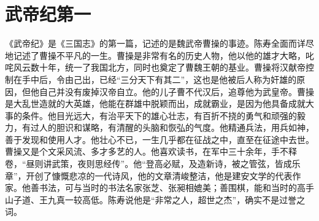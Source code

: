 \documentclass[12pt,UTF8]{ctexbook}
\begin{document}
\chapter{武帝纪第一}

《武帝纪》是《三国志》的第一篇，记述的是魏武帝曹操的事迹。陈寿全面而详尽地记述了曹操不平凡的一生。曹操是非常有名的历史人物，他以他的雄才大略，叱咤风云数十年，统一了我国北方，同时也奠定了曹魏王朝的基业。曹操将汉献帝控制在手中后，令由己出，已经“三分天下有其二”，这也是他被后人称为奸雄的原因，但他自己并没有废掉汉帝自立。他的儿子曹不代汉后，追尊他为武皇帝。曹操是大乱世造就的大英雄，他能在群雄中脱颖而出，成就霸业，是因为他具备成就大事的条件。他目光远大，有治平天下的雄心壮志，有百折不挠的勇气和顽强的毅力，有过人的胆识和谋略，有清醒的头脑和恢弘的气度。他精通兵法，用兵如神，善于发现和使用人才。他壮心不已，一生几乎都在征战之中，直至在征途中去世。曹操又是个文采风流、多才多艺的人。他喜欢读书，在军中三十余年，手不释卷，“昼则讲武策，夜则思经传”。他“登高必赋，及造新诗，被之管弦，皆成乐章”，开创了慷慨悲凉的一代诗风，他的文章清峻整洁，他是建安文学的代表作家。他善书法，可与当时的书法名家张芝、张昶相媲美；善围棋，能和当时的高手山子道、王九真一较高低。陈寿说他是“非常之人，超世之杰”，确实不是过誉之词。
\end{document}
